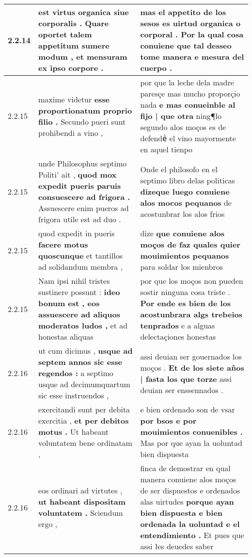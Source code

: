 \begin{tabular}{|p{1cm}|p{6.5cm}|p{6.5cm}|}
2.2.14 & est virtus organica siue corporalis . \textbf{ Quare oportet talem appetitum sumere modum , } et mensuram ex ipso corpore . & mas el appetito de los sesos es uirtud organica o corporal . \textbf{ Por la qual cosa conuiene } que tal desseo tome manera e mesura del cuerpo . \\\hline
2.2.15 & maxime videtur \textbf{ esse proportionatum proprio filio . } Secundo pueri sunt prohibendi a vino , & por que la leche dela madre paresçe mas mucho proporçio nada \textbf{ e mas conueinble al fijo | que otra } ning¶lo segundo alos moços es de defendeᷤ el vino mayormente en aquel tienpo \\\hline
2.2.15 & unde Philosophus septimo Politi’ ait , \textbf{ quod mox expedit pueris paruis consuescere ad frigora . } Assuescere enim pueros ad frigora utile est ad duo . & Onde el philosofo en el septimo libro delas politicas \textbf{ dizeque luego conuiene alos mocos pequanos } de acostunbrar los alos frios \\\hline
2.2.15 & quod expedit in pueris \textbf{ facere motus quoscunque } et tantillos ad solidandum membra , & dize \textbf{ que conuiene alos moços de faz quales quier mouimientos pequanos } para soldar los mienbros \\\hline
2.2.15 & Nam ipsi nihil tristes sustinere possunt : \textbf{ ideo bonum est , eos assuescere ad aliquos moderatos ludos , } et ad honestas aliquas & por que los moços non pueden sostir ninguna cosa triste . \textbf{ Por ende es bien de los acostunbrara algs trebeios tenprados } e a alguas delectaçiones honestas \\\hline
2.2.16 & ut cum dicimus , \textbf{ usque ad septem annos sic esse regendos : } a septimo usque ad decimumquartum sic esse instruendos , & assi deuian ser gouernados los moços . \textbf{ Et de los siete años | fasta los que torze } assi deuian ser enssennados . \\\hline
2.2.16 & exercitandi sunt per debita exercitia , \textbf{ et per debitos motus . } Ut habeant voluntatem bene ordinatam , & e bien ordenado son de vsar \textbf{ por bsos e por mouimientos conuenibles . } Mas por que ayan la uoluntad bien dispuesta \\\hline
2.2.16 & eos ordinari ad virtutes , \textbf{ ut habeant dispositam voluntatem . } Sciendum ergo , & finca de demostrar en qual manera conuiene alos moços de ser dispuestos e ordenados alas uirtudes \textbf{ porque ayan bien dispuesta e bien ordenada la uoluntad e el entendimiento . } Et pues que assi łes deuedes saber \\\hline

\end{tabular}
